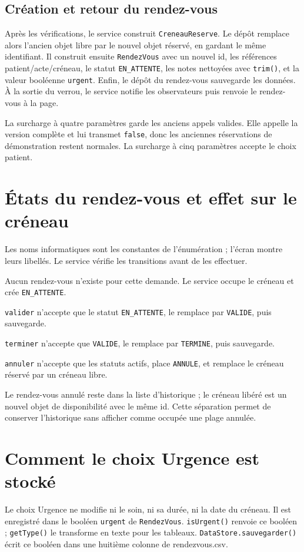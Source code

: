 \documentclass[11pt,a4paper]{report}
\begin{document}
\subsection{Création et retour du rendez-vous}
Après les vérifications, le service construit \texttt{CreneauReserve}. Le dépôt remplace alors l'ancien objet libre par le nouvel objet réservé, en gardant le même identifiant. Il construit ensuite \texttt{RendezVous} avec un nouvel id, les références patient/acte/créneau, le statut \texttt{EN\_ATTENTE}, les notes nettoyées avec \texttt{trim()}, et la valeur booléenne \texttt{urgent}. Enfin, le dépôt du rendez-vous sauvegarde les données. À la sortie du verrou, le service notifie les observateurs puis renvoie le rendez-vous à la page.

La surcharge à quatre paramètres garde les anciens appels valides. Elle appelle la version complète et lui transmet \texttt{false}, donc les anciennes réservations de démonstration restent normales. La surcharge à cinq paramètres accepte le choix patient.

\section{États du rendez-vous et effet sur le créneau}
Les noms informatiques sont les constantes de l'énumération ; l'écran montre leurs libellés. Le service vérifie les transitions avant de les effectuer.
\begin{description}[leftmargin=3.2cm,style=nextline]
\item[Réservation] Aucun rendez-vous n'existe pour cette demande. Le service occupe le créneau et crée \texttt{EN\_ATTENTE}.
\item[Validation] \texttt{valider} n'accepte que le statut \texttt{EN\_ATTENTE}, le remplace par \texttt{VALIDE}, puis sauvegarde.
\item[Fin du soin] \texttt{terminer} n'accepte que \texttt{VALIDE}, le remplace par \texttt{TERMINE}, puis sauvegarde.
\item[Annulation] \texttt{annuler} n'accepte que les statuts actifs, place \texttt{ANNULE}, et remplace le créneau réservé par un créneau libre.
\end{description}
Le rendez-vous annulé reste dans la liste d'historique ; le créneau libéré est un nouvel objet de disponibilité avec le même id. Cette séparation permet de conserver l'historique sans afficher comme occupée une plage annulée.

\section{Comment le choix Urgence est stocké}
Le choix Urgence ne modifie ni le soin, ni sa durée, ni la date du créneau. Il est enregistré dans le booléen \texttt{urgent} de \texttt{RendezVous}. \texttt{isUrgent()} renvoie ce booléen ; \texttt{getType()} le transforme en texte pour les tableaux. \texttt{DataStore.sauvegarder()} écrit ce booléen dans une huitième colonne de rendezvous.csv.
\end{document}
